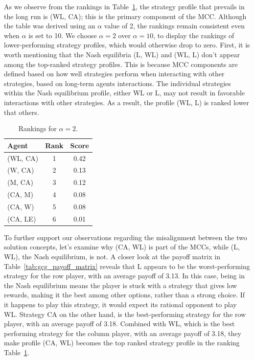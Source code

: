         \noindent
        As we observe from the rankings in Table~\ref{tab:ranking_table}, the strategy profile that prevails in the long run is (WL, CA); this is the primary component of the MCC. Although the table was derived using an $\alpha$ value of 2, the rankings remain consistent even when $\alpha$ is set to 10. We choose $\alpha=2$ over $\alpha=10$, to display the rankings of lower-performing strategy profiles, which would otherwise drop to zero. First, it is worth mentioning that the Nash equilibria (L, WL) and (WL, L) don't appear among the top-ranked strategy profiles. This is because MCC components are defined based on how well strategies perform when interacting with other strategies, based on long-term agents interactions. The individual strategies within the Nash equilibrium profile, either WL or L, may not result in favorable interactions with other strategies. As a result, the profile (WL, L) is ranked lower that others.
        \begin{table}[H]
            \centering
            \caption{Rankings for $\alpha=2$.}
            \label{tab:ranking_table}
            \vspace{0.5em}
            \begin{tabular}{lcc}
                \hline
                \textbf{Agent} & \textbf{Rank} & \textbf{Score} \\
                \hline
                (WL, CA) & 1 & 0.42 \\
                (W, CA) & 2 & 0.13 \\
                (M, CA) & 3 & 0.12 \\
                (CA, M) & 4 & 0.08 \\
                (CA, W) & 5 & 0.08 \\
                (CA, LE) & 6 & 0.01 \\
                \hline
            \end{tabular}
        \end{table}

        \noindent
        To further support our observations regarding the misalignment between the two solution concepts, let's examine why (CA, WL) is part of the MCCs, while (L, WL), the Nash equilibrium, is not. A closer look at the payoff matrix in Table~\ref{tab:gcg_payoff_matrix} reveals that L appears to be the worst-performing strategy for the row player, with an average payoff of 3.13. In this case, being in the Nash equilibrium means the player is stuck with a strategy that gives low rewards, making it the best among other options, rather than a strong choice. If it happens to play this strategy, it would expect its rational opponent to play WL. Strategy CA on the other hand, is the best-performing strategy for the row player, with an average payoff of 3.18. Combined with WL, which is the best performing strategy for the column player, with an average payoff of 3.18, they make profile (CA, WL) becomes the top ranked strategy profile in the ranking Table~\ref{tab:ranking_table}.\tinydouble

